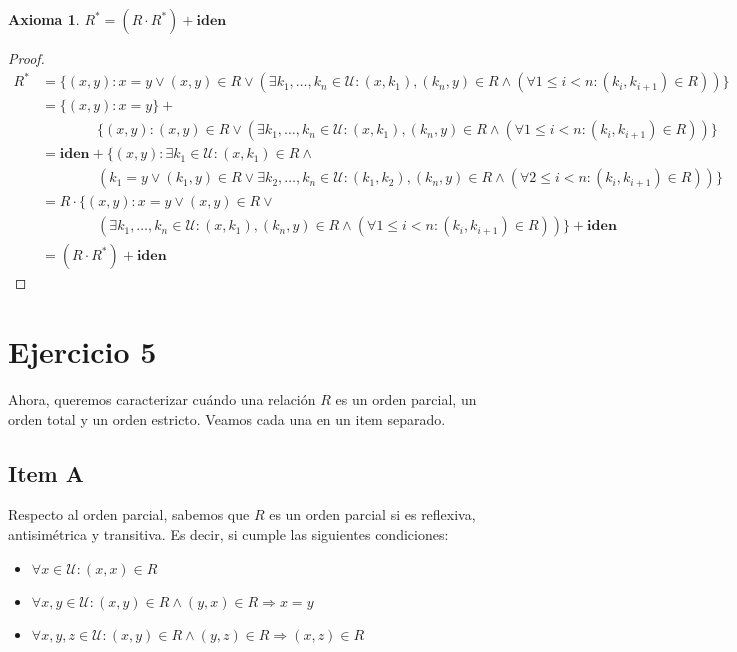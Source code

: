 \documentclass{article}
\newtheorem*{axiom}{Axioma}
\newcommand{\U}{\mathcal{U}}
\newcommand{\iden}{\textbf{iden}}
\begin{document}
\begin{axiom}
  $R^* = (R \cdot R^*) + \iden$
\end{axiom}
\begin{proof}
  \begin{equation*}
    \begin{aligned}
      R^* &= \{(x, y) : x = y \lor (x, y) \in R \lor (\exists k_1, \dots, k_n \in \U : (x, k_1), (k_n, y) \in R \land (\forall 1 \leq i < n : (k_i, k_{i+1}) \in R))\} \\ 
          &= \{(x, y) : x = y\} + \\ 
          & \qquad\qquad \{(x, y) : (x, y) \in R \lor (\exists k_1, \dots, k_n \in \U : (x, k_1), (k_n, y) \in R \land (\forall 1 \leq i < n : (k_i, k_{i+1}) \in R))\} \\ 
          &= \iden + \{(x, y) : \exists k_1 \in \U : (x, k_1) \in R \land \\ 
          & \qquad\qquad (k_1 = y \lor (k_1, y) \in R \lor \exists k_2, \dots, k_n \in \U : (k_1, k_2), (k_n, y) \in R \land (\forall 2 \leq i < n : (k_i, k_{i+1}) \in R))\} \\ 
          &= R \cdot \{(x, y) : x = y \lor (x, y) \in R \lor \\ 
          & \qquad\qquad (\exists k_1, \dots, k_n \in \U : (x, k_1), (k_n, y) \in R \land (\forall 1 \leq i < n : (k_i, k_{i+1}) \in R))\} + \iden \\ 
          &= (R \cdot R^*) + \iden
    \end{aligned}
  \end{equation*}
\end{proof}

\section*{Ejercicio 5}
Ahora, queremos caracterizar cuándo una relación $R$ es un orden parcial, un orden total y un orden estricto.
Veamos cada una en un item separado.

\subsection*{Item A}
Respecto al orden parcial, sabemos que $R$ es un orden parcial si es reflexiva, antisimétrica y transitiva.
Es decir, si cumple las siguientes condiciones:
\begin{itemize}
  \item $\forall x \in \U : (x, x) \in R$
  \item $\forall x, y \in \U : (x, y) \in R \land (y, x) \in R \Rightarrow x = y$
  \item $\forall x, y, z \in \U : (x, y) \in R \land (y, z) \in R \Rightarrow (x, z) \in R$
\end{itemize}
\end{document}
